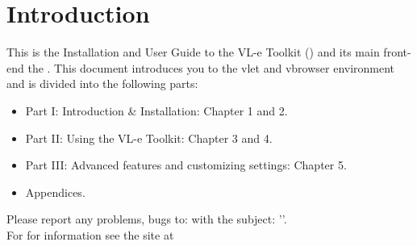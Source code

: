 \chapter{Introduction}
\label{sec:Introduction}




This is the Installation and User Guide to the VL-e Toolkit (\vlet) and its
main front-end the \vbrowser. 
This document introduces you to the vlet and vbrowser 
environment and is divided into the following parts: 

\begin{itemize} 
  \item 
    Part I: Introduction \& Installation: Chapter 1 and 2.
  \item 
    Part II: Using the VL-e Toolkit: Chapter 3 and 4. 
  \item
    Part III: Advanced features and customizing settings: Chapter 5.  
  \item
    Appendices.  
\end{itemize} 

Please report any problems, bugs to:  with the subject: 
''.\\
For for information see the site at \\


